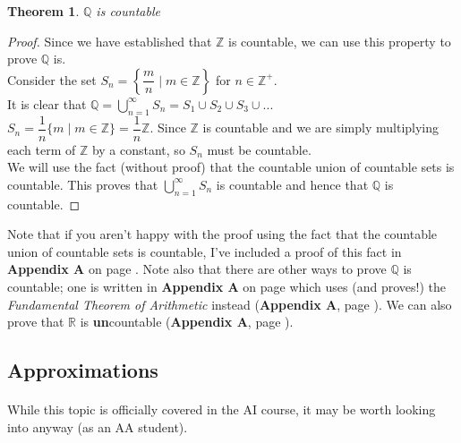 \documentclass[12pt, a4paper, titlepage, twoside]{article}
\newcommand*{\Z}{\mathbb{Z}}
\newcommand*{\Q}{\mathbb{Q}}
\newcommand*{\R}{\mathbb{R}}
\newtheorem*{theorem*}{Theorem}
\begin{document}
	\begin{pf}
		\label{pf:q-count}
		\begin{theorem*}
			$\Q$ is countable
		\end{theorem*}

		\tcbline		
		
		\begin{proof}
			Since we have established that $\Z$ is countable, we can use this property to prove $\Q$ is.\\
			
			Consider the set $S_n = \left\lbrace \dfrac{m}{n} \mid m \in \Z \right\rbrace$ for $n \in \Z^+$.\\
			
			It is clear that $\displaystyle \Q = \mathop{\bigcup}_{n=1}^{\infty} S_n = S_1 \cup S_2 \cup S_3 \cup ...$\\
			
			$S_n = \dfrac{1}{n} \{m \mid m \in \Z\} = \dfrac{1}{n} \Z$. Since $\Z$ is countable and we are simply multiplying
			each term of $\Z$ by a constant, so $S_n$ must be countable.\\
			
			We will use the fact (without proof) that the countable union of countable sets is countable. This proves that $\displaystyle 
			\mathop{\bigcup}_{n=1}^{\infty} S_n$ is countable and hence that $\Q$ is countable.
		\end{proof}
		\hfill
		
		Note that if you aren't happy with the proof using the fact that the countable union of countable sets is countable,
		I've included a proof of this fact in \textbf{Appendix A} on page \pageref*{apA:ctble-union}. Note also that
		there are other ways to prove $\Q$ is countable; one is written in \textbf{Appendix A} on page \pageref*{apA:q-count-fta} which
		uses (and proves!) the \textit{Fundamental Theorem of Arithmetic} instead (\textbf{Appendix A}, page \pageref*{apA:fta}). We can also
		prove that $\R$ is \textbf{un}countable (\textbf{Appendix A}, page \pageref*{apA:r-uncount}).
	\end{pf}
	
	\subsection{Approximations}
	
	\paragraph{}
	While this topic is officially covered in the AI course, it may be worth looking into anyway (as an AA student).
	
\end{document}

